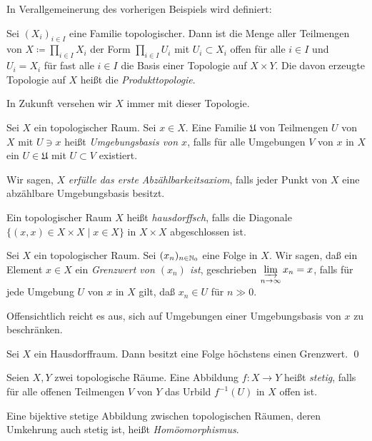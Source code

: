 In Verallgemeinerung des vorherigen Beispiels wird definiert:
\begin{example}
	Sei \((X_i)_{i \in I}\) eine Familie topologischer. Dann ist die Menge aller Teilmengen von \(X \coloneqq
	\prod_{i \in I} X_i\) der Form
	\(\prod_{i \in I} U_i\) mit \(U_i \subset X_i\) offen für alle \(i \in I\) und \(U_i = X_i\) für fast alle
	\(i \in I\) die Basis einer Topologie auf \(X \times Y\). Die davon erzeugte Topologie auf \(X\) heißt die
	\emph{Produkttopologie}.
	
	In Zukunft versehen wir \(X\) immer mit dieser Topologie.
\end{example}

\begin{definition}
	Sei \(X\) ein topologischer Raum. Sei \(x \in X\). Eine Familie \(\mathfrak U\) von Teilmengen \(U\) von \(X\)
	mit \(U \ni x\) heißt \emph{Umgebungsbasis von \(x\)}, falls für alle Umgebungen \(V\) von \(x\) in \(X\)
	ein \(U \in \mathfrak U\) mit \(U \subset V\) existiert.
	
	Wir sagen, \(X\) \emph{erfülle das erste Abzählbarkeitsaxiom}, falls jeder Punkt von \(X\) eine abzählbare
	Umgebungsbasis besitzt.
\end{definition}

\begin{definition}
	Ein topologischer Raum \(X\) heißt \emph{hausdorffsch}, falls die Diagonale
	\(\{(x, x) \in X \times X \mid x \in X\}\) in \(X \times X\) abgeschlossen ist.
\end{definition}

\begin{definition}
	Sei \(X\) ein topologischer Raum. Sei \((x_n)_{n \in \mathbb N_0}\) eine Folge in \(X\). Wir sagen, daß
	ein Element \(x \in X\) ein \emph{Grenzwert von \((x_n)\) ist}, geschrieben \(\varinjlim_{n \to \infty}\limits x_n = x\),
	falls für jede Umgebung \(U\) von \(x\) in \(X\) gilt, daß \(x_n \in U\) für \(n \gg 0\).
\end{definition}
Offensichtlich reicht es aus, sich auf Umgebungen einer Umgebungsbasis von \(x\) zu beschränken.

\begin{proposition}
	Sei \(X\) ein Hausdorffraum. Dann besitzt eine Folge höchstens einen Grenzwert.
	\qed
\end{proposition}

\begin{definition}
	Seien \(X, Y\) zwei topologische Räume. Eine Abbildung \(f\colon X \to Y\) heißt \emph{stetig}, falls
	für alle offenen Teilmengen \(V\) von \(Y\) das Urbild \(f^{-1}(U)\) in \(X\) offen ist.
	
	Eine bijektive stetige Abbildung zwischen topologischen Räumen, deren Umkehrung auch stetig ist, heißt
	\emph{Homöomorphismus}.
\end{definition}

